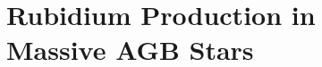 \chapter[Rubidium Production in Massive AGB Stars]{\textbf{Rubidium Production in \\ Massive AGB Stars}}
\label{chap:Rb}

